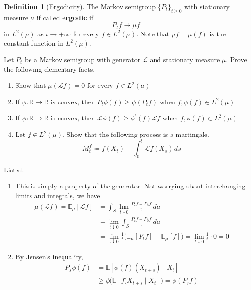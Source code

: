 \documentclass{article}
\theoremstyle{definition}
\theoremstyle{remark}
\theoremstyle{definition}
\newtheorem{definition}{Definition}[section]
\begin{document}
  \begin{definition}[Ergodicity]
  The Markov semigroup $\{P_t\}_{t \geq 0}$ with stationary measure $\mu$ if called \textbf{ergodic} if 
  \[P_t f \rightarrow \mu f\]
  in $L^2 (\mu)$ as $t \rightarrow +\infty$ for every $f \in L^2 (\mu)$. Note that $\mu f = \mu(f)$ is the constant function in $L^2 (\mu)$. 
  \end{definition}

  \begin{exercise}
  Let $P_t$ be a Markov semigroup with generator $\mathscr{L}$ and stationary measure $\mu$. Prove the following elementary facts. 
  \begin{enumerate}
      \item Show that $\mu( \mathscr{L} f) = 0$ for every $f \in L^2 (\mu)$ 
      \item If $\phi : \mathbb{R} \rightarrow \mathbb{R}$ is convex, then $P_t \phi (f) \geq \phi (P_t f)$ when $f, \phi(f) \in L^2(\mu)$ 
      \item If $\phi : \mathbb{R} \rightarrow \mathbb{R}$ is convex, then $\mathscr{L} \phi(f) \geq \phi^\prime (f) \mathscr{L} f$ when $f, \phi(f) \in L^2 (\mu)$ 
      \item Let $f \in L^2 (\mu)$. Show that the following process is a martingale. 
      \[M_t^f \coloneqq f(X_t) - \int_0^t \mathscr{L} f(X_s) \,ds\]
  \end{enumerate}
  \end{exercise}
  \begin{solution}
  Listed. 
  \begin{enumerate}
      \item This is simply a property of the generator. Not worrying about interchanging limits and integrals, we have 
      \begin{align*}
          \mu(\mathscr{L} f) = \mathbb{E}_\mu [\mathscr{L} f] & = \int_S \lim_{t \downarrow 0} \frac{P_t f - P_0 f}{t} \,d\mu \\ 
          & = \lim_{t \downarrow 0} \int_S \frac{P_t f - P_0 f}{t} \,d\mu \\
          & = \lim_{t \downarrow 0} \frac{1}{t} \big( \mathbb{E}_\mu [P_t f] - \mathbb{E}_\mu [f] \big) = \lim_{t \downarrow 0} \frac{1}{t} \cdot 0 = 0 
      \end{align*}
      
      \item By Jensen's inequality, 
      \begin{align*}
          P_s \phi(f) & = \mathbb{E} [ \phi(f) (X_{t + s}) \mid X_t] \\
          & \geq \phi \bigg( \mathbb{E}[f(X_{t + s} \mid X_t] \big) = \phi(P_s f)
      \end{align*}

  \end{enumerate}
  \end{solution}
\end{document}
